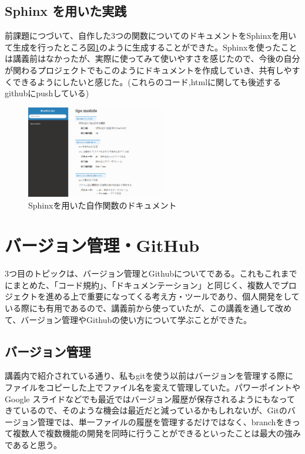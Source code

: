 \documentclass[12pt]{jsarticle}
\begin{document}
\subsection{Sphinx を用いた実践}
前課題につづいて、自作した3つの関数についてのドキュメントをSphinxを用いて生成を行ったところ図\ref{fig:sphinx}のように生成することができた。Sphinxを使ったことは講義前はなかったが、実際に使ってみて使いやすさを感じたので、今後の自分が関わるプロジェクトでもこのようにドキュメントを作成していき、共有しやすくできるようにしたいと感じた。(これらのコード,htmlに関しても後述するgithubにpushしている)

\begin{figure}[htbp]
  \begin{center}
    \includegraphics[width=6.0cm]{./sphinx.png}
    \caption{Sphinxを用いた自作関数のドキュメント}
    \label{fig:sphinx}
  \end{center}
\end{figure}



\newpage
\section{バージョン管理・GitHub}
3つ目のトピックは、バージョン管理とGithubについてである。これもこれまでにまとめた、「コード規約」、「ドキュメンテーション」と同じく、複数人でプロジェクトを進める上で重要になってくる考え方・ツールであり、個人開発をしている際にも有用であるので、講義前から使っていたが、この講義を通して改めて、バージョン管理やGithubの使い方について学ぶことができた。

\subsection{バージョン管理}
講義内で紹介されている通り、私もgitを使う以前はバージョンを管理する際にファイルをコピーした上でファイル名を変えて管理していた。パワーポイントやGoogle スライドなどでも最近ではバージョン履歴が保存されるようにもなってきているので、そのような機会は最近だと減っているかもしれないが、Gitのバージョン管理では、単一ファイルの履歴を管理するだけではなく、branchをきって複数人で複数機能の開発を同時に行うことができるといったことは最大の強みであると思う。
\end{document}

